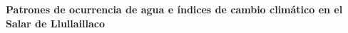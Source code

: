 \begin{titlepage}

    \begin{flushright}
        \setlength{\rightskip}{-2cm} %
        \vspace*{7.5cm} %

        {\bfseries\fontsize{33pt}{40pt}\selectfont
        Patrones de ocurrencia de agua e índices de cambio climático en el Salar de Llullaillaco} \\[1.5cm]


\end{flushright}
\end{titlepage}
